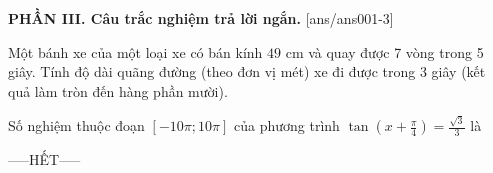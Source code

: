 \documentclass[12pt,a4paper]{article}
\begin{document}
{\bf PHẦN III. Câu trắc nghiệm trả lời ngắn.}
\setcounter{ex}{0}
[ans/ans001-3]
\begin{ex}
 Một bánh xe của một loại xe có bán kính ${49}$ cm và quay được 7 vòng trong 5 giây. Tính độ dài quãng đường (theo đơn vị mét) xe đi được trong 3 giây (kết quả làm tròn đến hàng phần mười). 

\end{ex}

\begin{ex}
 Số nghiệm thuộc đoạn $[- 10 \pi;10 \pi]$ của phương trình $\tan \left(x + \frac{\pi}{4}\right)=\frac{\sqrt{3}}{3}$ là

\end{ex}


 \begin{center}
-----HẾT-----
\end{center}

\newpage 
\end{document}
